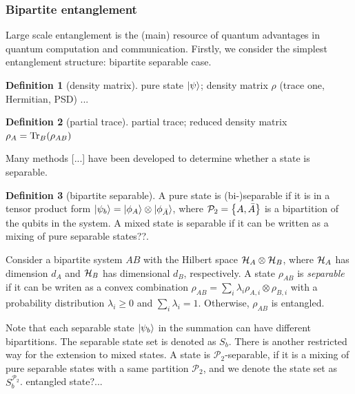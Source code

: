 \documentclass[
10pt,
aps,
pra,
linenumbers,
floatfix,
]{revtex4-2}
\theoremstyle{plain}
\theoremstyle{definition}
\newtheorem{definition}{Definition}
\newtheorem{example}{Example}
\newcommand{\ppartition}{\mathcal{P}}
\newcommand{\dm}{\rho}
\begin{document}
\subsubsection{Bipartite entanglement}
Large scale entanglement is the (main) resource of quantum advantages in quantum computation and communication.
Firstly, we consider the simplest entanglement structure: bipartite separable case.
\begin{definition}[density matrix]\label{def:density_matrix}
	pure state $\ket{\psi}$;
	density matrix $\dm$ (trace one, Hermitian, PSD)	...
\end{definition}
\begin{definition}[partial trace]
	partial trace;
	reduced density matrix $\dm_A = \Tr_B(\dm_{AB})$
\end{definition}
Many methods [...] have been developed to determine whether a state is separable.
\begin{definition}[bipartite separable]\label{def:bipartite_separable}
	A pure state is (bi-)separable if it is in a tensor product form $\ket{\psi_b}=\ket{\phi_A}\otimes\ket{\phi_{\bar{A}}}$, 
	where $\ppartition_2 = \qty{ A, \bar{A} }$ is a bipartition of the qubits in the system.
	A mixed state is separable if it can be written as a mixing of pure separable states??.

	Consider a bipartite system $AB$ with the Hilbert space $\mathcal{H}_A \otimes \mathcal{H}_B$, where $\mathcal{H}_A$ has dimension $d_A$ and $\mathcal{H}_B$ has dimensional $d_B$, respectively.
	A state $\dm_{AB}$ is \emph{separable} if it can be writen as a convex combination $\dm_{AB}= \sum_i \lambda_i \dm_{A,i} \otimes \dm_{B,i}$ with a probability distribution $\lambda_i\ge 0$ and $\sum_i \lambda_i = 1$. Otherwise, $\dm_{AB}$ is entangled.

	Note that each separable state $\ket{\psi_b}$ in the summation can have different bipartitions.
	The separable state set is denoted as $S_b$.
	There is another restricted way for the extension to mixed states. 
	A state is $\ppartition_2$-separable, if it is a mixing of pure separable states with a same partition $\ppartition_2$, 
	and we denote the state set as $S_b^{\ppartition_2}$. 
	entangled state?...
\end{definition}
\end{document}
